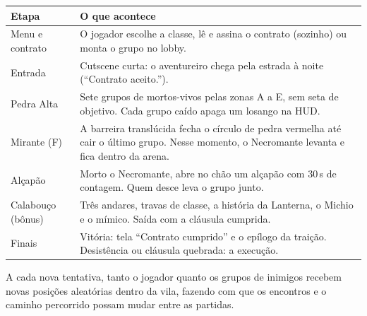 \documentclass[11pt,a4paper]{article}
\begin{document}
\begin{xltabular}{\textwidth}{@{}lX@{}}
\toprule
\textbf{Etapa} & \textbf{O que acontece} \\
\midrule
Menu e contrato & O jogador escolhe a classe, lê e assina o contrato (sozinho) ou monta o grupo no lobby. \\
Entrada & Cutscene curta: o aventureiro chega pela estrada à noite (``Contrato aceito.''). \\
Pedra Alta & Sete grupos de mortos-vivos pelas zonas A a E, sem seta de objetivo. Cada grupo caído apaga um losango na HUD. \\
Mirante (F) & A barreira translúcida fecha o círculo de pedra vermelha até cair o último grupo. Nesse momento, o Necromante levanta e fica dentro da arena. \\
Alçapão & Morto o Necromante, abre no chão um alçapão com 30\,s de contagem. Quem desce leva o grupo junto. \\
Calabouço (bônus) & Três andares, travas de classe, a história da Lanterna, o Michio e o mímico. Saída com a cláusula cumprida. \\
Finais & Vitória: tela ``Contrato cumprido'' e o epílogo da traição. Desistência ou cláusula quebrada: a execução. \\
\bottomrule
\end{xltabular}

A cada nova tentativa, tanto o jogador quanto os grupos de inimigos recebem novas posições aleatórias dentro da vila, fazendo com que os encontros e o caminho percorrido possam mudar entre as partidas.
\end{document}
